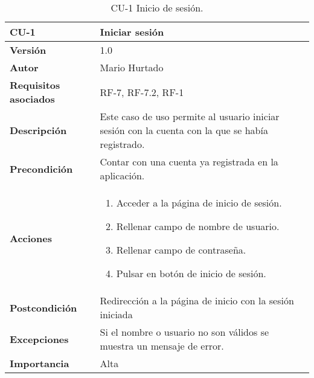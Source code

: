 \begin{table}[p]
	\centering
	\begin{tabularx}{\linewidth}{ p{} p{} }
			\toprule
			\textbf{CU-1}    & \textbf{Iniciar sesión}\\
			\toprule
			\textbf{Versión}              & 1.0    \\
			\textbf{Autor}                & Mario Hurtado \\
			\textbf{Requisitos asociados} & RF-7, RF-7.2, RF-1 \\
			\textbf{Descripción}          & Este caso de uso permite al usuario iniciar sesión con la cuenta con la que se había registrado. \\
			\textbf{Precondición}         & Contar con una cuenta ya registrada en la aplicación.\\
			\textbf{Acciones}             &
			\begin{enumerate}
					\def\labelenumi{\arabic{enumi}.}
					\tightlist
					\item Acceder a la página de inicio de sesión.
					\item Rellenar campo de nombre de usuario.
					\item Rellenar campo de contraseña.
					\item Pulsar en botón de inicio de sesión.
				\end{enumerate}\\
			\textbf{Postcondición}        & Redirección a la página de inicio con la sesión iniciada\\
			\textbf{Excepciones}          & Si el nombre o usuario no son válidos se muestra un mensaje de error. \\
			\textbf{Importancia}          & Alta\\
			\bottomrule
		\end{tabularx}
	\caption{CU-1 Inicio de sesión.}
\end{table}

